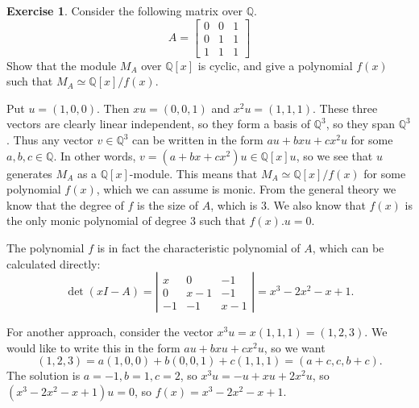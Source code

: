 \documentclass{amsart}
\newcommand{\bbm}       {\left[\begin{matrix}}
\newcommand{\ebm}       {\end{matrix}\right]}
\newcommand{\Q}         {{\mathbb{Q}}}
\newcommand{\ip}[1]     {\langle #1\rangle}
\renewcommand{\:}{\colon}
\theoremstyle{definition}
\newtheorem{exercise}{Exercise}[section]
\renewenvironment{solution}{\SolutionAtEnd}{\endSolutionAtEnd}
\begin{document}
\begin{exercise}
 Consider the following matrix over $\Q$.
 \[ A = \bbm 0&0&1\\0&1&1\\1&1&1 \ebm \]
 Show that the module $M_A$ over $\Q[x]$ is cyclic, and give a
 polynomial $f(x)$ such that $M_A\simeq\Q[x]/f(x)$.
\end{exercise}
\begin{solution}
 Put $u=(1,0,0)$.  Then $xu=(0,0,1)$ and $x^2u=(1,1,1)$.  These three
 vectors are clearly linear independent, so they form a basis of
 $\Q^3$, so they span $\Q^3$.  Thus any vector $v\in\Q^3$ can be
 written in the form $au+bxu+cx^2u$ for some $a,b,c\in\Q$.  In other
 words, $v=(a+bx+cx^2)u\in\Q[x]u$, so we see that $u$ generates $M_A$
 as a $\Q[x]$-module.  This means that $M_A\simeq\Q[x]/f(x)$ for some
 polynomial $f(x)$, which we can assume is monic.  From the general
 theory we know that the degree of $f$ is the size of $A$, which is
 $3$.  We also know that $f(x)$ is the only monic polynomial of degree
 $3$ such that $f(x).u=0$.

 The polynomial $f$ is in fact the characteristic polynomial of $A$,
 which can be calculated directly:
 \[ \det(xI-A) = \left| \begin{array}{ccc} 
     x & 0 & -1 \\ 0 & x-1 & -1 \\ -1 & -1 & x-1 
    \end{array} \right| =
    x^3 - 2 x^2 - x + 1.
 \]
 
 For another approach, consider the vector $x^3u=x(1,1,1)=(1,2,3)$.
 We would like to write this in the form $au+bxu+cx^2u$, so we want
 \[ (1,2,3)=a(1,0,0) + b(0,0,1) + c(1,1,1)=(a+c,c,b+c). \]
 The solution is $a=-1,b=1,c=2$, so $x^3u=-u+xu+2x^2u$, so
 $(x^3-2x^2-x+1)u=0$, so $f(x)=x^3- 2 x^2 - x + 1$.
\end{solution}
\end{document}
